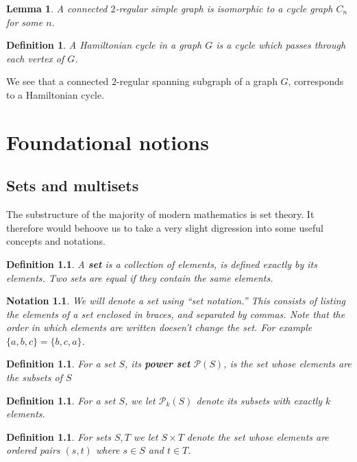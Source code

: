 \documentclass[12pt]{report}
\theoremstyle{plain}
\newtheorem{defn}[thm]{Definition}
\newtheorem{notn}[thm]{Notation}
\newtheorem{lem}[thm]{Lemma}
\newcommand{\ms}[1]{\mathscr #1}
\newcommand{\Xb}[1]{\textbf{#1}\index{#1}}
\begin{document}
\begin{lem}
A connected $2$-regular simple graph is isomorphic to a cycle graph $C_n$
for some $n$.
\end{lem}

\begin{defn}
A Hamiltonian cycle in a graph $G$ is a cycle which passes through each
vertex of $G$.
\end{defn}

We see that a connected $2$-regular spanning subgraph of a graph $G$,
corresponds to a Hamiltonian cycle. 

\appendix

\chapter{Foundational notions}

\section{Sets and multisets}

The substructure of the majority of modern mathematics is set theory. It
therefore would behoove us to take a very slight digression into some
useful concepts and notations.

\begin{defn}
A \Xb{set} is a collection of elements, is defined exactly by its elements.
Two sets are equal if they contain the same elements.
\end{defn}

\begin{notn}
We will denote a set using ``set notation.'' This consists of listing the
elements of a set enclosed in braces, and separated by commas. Note that
the order in which elements are written doesen't change the set. For
example $\{a, b, c\} = \{b, c, a\}$.
\end{notn}

\begin{defn}
For a set $S$, its \Xb{power set} $\ms P(S)$, is the set whose
elements are the subsets of $S$
\end{defn}

\begin{defn}
For a set $S$, we let $\ms P_k(S)$ denote its subsets with exactly $k$
elements.
\end{defn}

\begin{defn}
For sets $S, T$ we let $S \times T$ denote the set whose elements are
ordered pairs $(s, t)$ where $s \in S$ and $t \in T$.
\end{defn}
\end{document}
